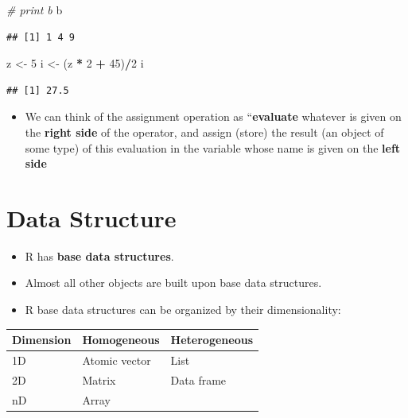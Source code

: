 \documentclass[]{book}
\newenvironment{Shaded}{\begin{snugshade}}{\end{snugshade}}
\newcommand{\CommentTok}[1]{\textcolor[rgb]{0.56,0.35,0.01}{\textit{#1}}}
\newcommand{\DecValTok}[1]{\textcolor[rgb]{0.00,0.00,0.81}{#1}}
\newcommand{\NormalTok}[1]{#1}
\newcommand{\OperatorTok}[1]{\textcolor[rgb]{0.81,0.36,0.00}{\textbf{#1}}}
\newcommand{\StringTok}[1]{\textcolor[rgb]{0.31,0.60,0.02}{#1}}
\providecommand{\tightlist}{%
  \setlength{\itemsep}{0pt}\setlength{\parskip}{0pt}}
\begin{document}
\begin{Shaded}
\begin{Highlighting}[]
\CommentTok{# print b}
\NormalTok{b}
\end{Highlighting}
\end{Shaded}

\begin{verbatim}
## [1] 1 4 9
\end{verbatim}

\begin{Shaded}
\begin{Highlighting}[]
\NormalTok{z <-}\StringTok{ }\DecValTok{5}
\NormalTok{i <-}\StringTok{ }\NormalTok{(z }\OperatorTok{*}\StringTok{ }\DecValTok{2} \OperatorTok{+}\StringTok{ }\DecValTok{45}\NormalTok{)}\OperatorTok{/}\DecValTok{2}
\NormalTok{i}
\end{Highlighting}
\end{Shaded}

\begin{verbatim}
## [1] 27.5
\end{verbatim}

\begin{itemize}
\tightlist
\item
  We can think of the assignment operation as ``\textbf{evaluate} whatever is given on the \textbf{right side} of the operator, and assign (store) the result (an object of some type) of this evaluation in the variable whose name is given on the \textbf{left side}
\end{itemize}

\hypertarget{data-structure}{%
\section{Data Structure}\label{data-structure}}

\begin{itemize}
\tightlist
\item
  R has \textbf{base data structures}.
\item
  Almost all other objects are built upon base data structures.
\item
  R base data structures can be organized by their dimensionality:
\end{itemize}

\begin{longtable}[]{@{}lll@{}}
\toprule
Dimension & Homogeneous & Heterogeneous\tabularnewline
\midrule
\endhead
1D & Atomic vector & List\tabularnewline
2D & Matrix & Data frame\tabularnewline
nD & Array &\tabularnewline
\bottomrule
\end{longtable}
\end{document}
